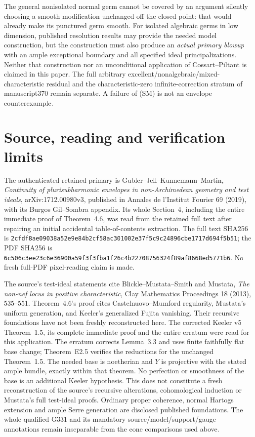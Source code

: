 \documentclass[11pt]{article}
\begin{document}
The general nonisolated normal germ cannot be covered by an argument
silently choosing a smooth modification unchanged off the closed point:
that would already make its punctured germ smooth. For isolated algebraic
germs in low dimension, published resolution results may provide the
needed model construction, but the construction must also produce an
\emph{actual primary blowup} with an ample exceptional boundary and all
specified ideal principalizations. Neither that construction nor an
unconditional application of Cossart--Piltant is claimed in this paper.
The full arbitrary excellent/nonalgebraic/mixed-characteristic residual
and the characteristic-zero infinite-correction stratum of manuscript370
remain separate. A failure of (SM) is not an envelope counterexample.

\section{Source, reading and verification limits}
The authenticated retained primary is Gubler--Jell--Kunnemann--Martin,
\emph{Continuity of plurisubharmonic envelopes in non-Archimedean
geometry and test ideals}, arXiv:1712.00980v3, published in Annales de
l'Institut Fourier 69 (2019), with its Burgos Gil--Sombra appendix.
Its whole Section~4, including the entire immediate proof of Theorem~4.6,
was read from the retained full text after repairing an initial accidental
table-of-contents extraction. The full text SHA256 is
\texttt{2cfdf8ae09038a52e9e84b2cf58ac301002e37f5c9c24896cbe1717d694f5b51};
the PDF SHA256 is
\texttt{6c506c3ee23c6e36900a59f3f3fba1f26c4b22708756324f89af8668ed5771b6}.
No fresh full-PDF pixel-reading claim is made.

The source's test-ideal statements cite Blickle--Mustata--Smith and
Mustata, \emph{The non-nef locus in positive characteristic}, Clay
Mathematics Proceedings 18 (2013), 535--551. Theorem~4.6's proof cites
Castelnuovo--Mumford regularity, Mustata's uniform generation, and
Keeler's generalized Fujita vanishing. Their recursive foundations have
not been freshly reconstructed here. The corrected Keeler v5 Theorem~1.5,
its complete immediate proof and the entire erratum were read for this
application. The erratum corrects Lemma~3.3 and uses finite faithfully flat
base change; Theorem~E2.5 verifies the reductions for the unchanged
Theorem~1.5. The needed base is noetherian and $Y$ is projective with
the stated ample bundle, exactly within that theorem. No perfection or
smoothness of the base is an additional Keeler hypothesis. This does not
constitute a fresh reconstruction of the source's recursive alterations,
cohomological induction or Mustata's full test-ideal proofs. Ordinary
proper coherence, normal Hartogs
extension and ample Serre generation are disclosed published foundations.
The whole qualified G331 and its mandatory source/model/support/gauge
annotations remain inseparable from the cone comparisons used above.
\end{document}
